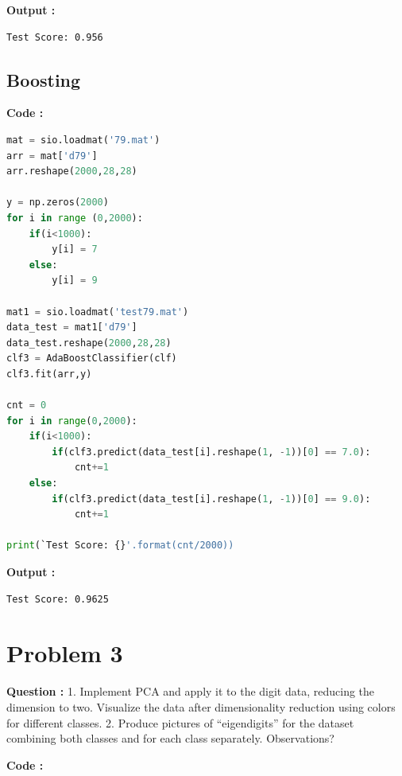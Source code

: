 \documentclass[a4paper, 11pt]{article}
\begin{document}
\textbf{Output :}
\begin{verbatim}
Test Score: 0.956
\end{verbatim}

\subsection*{Boosting}

\textbf{Code :}
\begin{lstlisting}[language=Python]
mat = sio.loadmat('79.mat')
arr = mat['d79']
arr.reshape(2000,28,28)

y = np.zeros(2000)
for i in range (0,2000):
    if(i<1000):
        y[i] = 7
    else:
        y[i] = 9
        
mat1 = sio.loadmat('test79.mat')
data_test = mat1['d79']
data_test.reshape(2000,28,28)
clf3 = AdaBoostClassifier(clf)
clf3.fit(arr,y)

cnt = 0
for i in range(0,2000):
    if(i<1000):
        if(clf3.predict(data_test[i].reshape(1, -1))[0] == 7.0):
            cnt+=1
    else:
        if(clf3.predict(data_test[i].reshape(1, -1))[0] == 9.0):
            cnt+=1

print(`Test Score: {}'.format(cnt/2000))

\end{lstlisting}

\textbf{Output :}
\begin{verbatim}
Test Score: 0.9625
\end{verbatim}

\section*{Problem 3}

\textbf{Question :} 1. Implement PCA and apply it to the digit data, reducing the dimension to two. Visualize the data after dimensionality reduction using colors for different classes.
2. Produce pictures of ``eigendigits'' for the dataset combining both classes and for each class separately. Observations?

\textbf{Code :}
\end{document}
